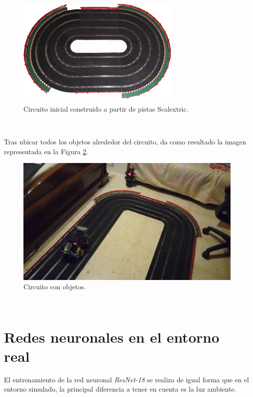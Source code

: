 \begin{figure} [h!]
	\begin{center}
		\includegraphics[width=8cm]{figs/circuit}
	\end{center}
	\caption{Circuito inicial construido a partir de pistas Scalextric.}
	\label{fig:circuit}
\end{figure}\

Tras ubicar todos los objetos alrededor del circuito, da como resultado la imagen representada en la Figura \ref{fig:circuitwithobjects}.\\

\begin{figure} [h!]
	\begin{center}
		\includegraphics[width=12cm]{figs/circuitwithobjects}
	\end{center}
	\caption{Circuito con objetos.}
	\label{fig:circuitwithobjects}
\end{figure}\

\section{Redes neuronales en el entorno real}
El entrenamiento de la red neuronal \textit{ResNet-18} se realiza de igual forma que en el entorno simulado, la principal diferencia a tener en cuenta es la luz ambiente.\\


